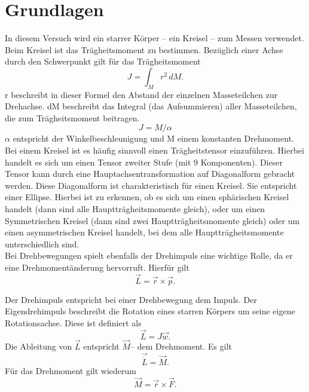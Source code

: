 \documentclass[12pt,a4paper,]{scrreprt}
\begin{document}
\section{Grundlagen}
In diesem Versuch wird ein starrer Körper – ein Kreisel – zum Messen  verwendet. Beim Kreisel ist  das Trägheitsmoment zu bestimmen. Bezüglich einer Achse durch den Schwerpunkt gilt für das Trägheitsmoment\\
\begin{equation}
J=\int_M r^2 \,dM .
\end{equation}
r beschreibt in dieser Formel den Abstand der einzelnen Masseteilchen zur Drehachse. dM beschreibt das Integral (das Aufsummieren) aller Masseteilchen, die zum Trägheitsmoment beitragen.
\begin{equation}
J=M/\alpha
\end{equation}
$\alpha$ entspricht der Winkelbeschleunigung und M einem konstanten Drehmoment.\\
Bei einem Kreisel ist es häufig sinnvoll einen Trägheitstensor einzuführen. Hierbei handelt es sich um einen Tensor zweiter Stufe (mit 9 Komponenten). Dieser Tensor kann durch eine Hauptachsentransformation auf Diagonalform gebracht werden. Diese Diagonalform ist charakteristisch für einen Kreisel. Sie entspricht einer Ellipse. Hierbei ist zu erkennen, ob es sich um einen sphärischen Kreisel handelt (dann sind alle Hauptträgheitsmomente gleich), oder um einen Symmetrischen Kreisel (dann sind zwei Hauptträgheitsmomente gleich) oder um einen asymmetrischen Kreisel handelt, bei dem alle Hauptträgheitsmomente unterschiedlich sind. \\
Bei Drehbewegungen spielt ebenfalls der Drehimpuls eine wichtige Rolle, da er eine Drehmomentänderung hervorruft. Hierfür gilt\\
\begin{equation}
\vec L= \vec r \times \vec p  .
\end{equation}

\pagebreak
Der Drehimpuls entspricht bei einer Drehbewegung dem Impuls. Der Eigendrehimpuls beschreibt die Rotation eines starren Körpers um seine eigene Rotationsachse. Diese ist definiert als\\
\begin{equation}
\vec L = J\vec w .
\end{equation}
Die Ableitung von $\vec L$ entspricht $ \vec M $– dem Drehmoment. Es gilt\\
\begin{equation}
\vec{\dot{L}} = \vec{M} .
\end{equation}
Für das Drehmoment gilt wiederum
\begin{equation}
\vec M = \vec r \times \vec F .
\end{equation}
\end{document}
